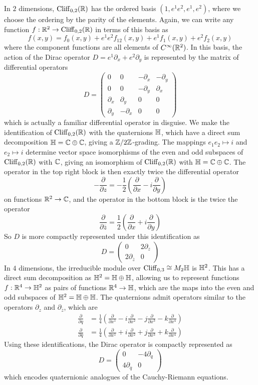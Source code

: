 In $2$ dimensions, $\operatorname{Cliff}_{0,2}(\mathbb{R})$ has the ordered basis $(1, e^1e^2, e^1,e^2)$,
where we choose the ordering by the parity of the elements. Again, we can
write any function $f : \mathbb{R}^2 \to \operatorname{Cliff}_{0,2}(\mathbb{R})$ in terms of this basis
as \[
f(x,y) = f_0(x,y) + e^1e^2f_{12}(x,y) + e^1f_1(x,y) + e^2f_2(x,y)
\]
where the component functions are all elements of $C^\infty(\mathbb{R}^2)$. In this
basis, the action of the Dirac operator $D = e^1\partial_x + e^2\partial_y$
is represented by the matrix of differential operators
\[
 D = \begin{pmatrix}
 0 & 0 & -\partial_x & -\partial_y \\
 0 & 0 & -\partial_y & \partial_x \\
 \partial_x & \partial_y & 0 & 0 \\
 \partial_y & -\partial_x & 0 & 0
 \end{pmatrix}
\]
which is actually a familiar differential operator in disguise. We make the
identification of $\operatorname{Cliff}_{0,2}(\mathbb{R})$ with the quaternions $\mathbb{H}$, which
have a direct sum decomposition $\mathbb{H} = \mathbb{C} \oplus \mathbb{C}$, giving a $\mathbb{Z}/2\mathbb{Z}$-grading.
The mappings $e_1e_2 \mapsto i$ and $e_2 \mapsto i$ determine vector space
isomorphisms of the even and odd subspaces of $\operatorname{Cliff}_{0,2}(\mathbb{R})$ with $\mathbb{C}$,
giving an isomorphism of $\operatorname{Cliff}_{0,2}(\mathbb{R})$ with $\mathbb{H} = \mathbb{C} \oplus \mathbb{C}$. The
operator in the top right block is then exactly twice the differential operator
\[
 -\frac{\partial}{\partial z} = -\frac{1}{2}\left( \frac{\partial}{\partial x}
 - i \frac{\partial}{\partial y}\right)
\]
on functions $\mathbb{R}^2 \to \mathbb{C}$, and the operator in the bottom block is the twice
the operator
\[
 \frac{\partial}{\partial \overline{z}} = \frac{1}{2}\left( \frac{\partial}{\partial x}
 + i \frac{\partial}{\partial y}\right)
\]
So $D$ is more compactly represented under this identification as
\[
 D = \begin{pmatrix}
 0 & 2\partial_z \\
 2\partial_{\overline{z}} & 0
 \end{pmatrix}
\]
In $4$ dimensions, the irreducible module over $\operatorname{Cliff}_{0,3} \cong M_2\mathbb{H}$ is
$\mathbb{H}^2$. This has a direct sum decomposition as $\mathbb{H}^2 = \mathbb{H} \oplus \mathbb{H}$, allowing
us to represent functions $f : \mathbb{R}^4 \to \mathbb{H}^2$ as pairs of functions $\mathbb{R}^4 \to \mathbb{H}$,
which are the maps into the even and odd subspaces of $\mathbb{H}^2 = \mathbb{H} \oplus \mathbb{H}$.
The quaternions admit operators similar to the operators $\partial_z$ and
$\partial_{\overline{z}}$, which are
%
\begin{align*}
 \frac{\partial}{\partial q}            & = \frac{1}{4}\left( \frac{\partial}{\partial x^1}
 - i \frac{\partial}{\partial x^2} - j\frac{\partial}{\partial x^3}
 - k \frac{\partial}{\partial x^4}\right) \\[5pt]
 \frac{\partial}{\partial \overline{q}} & = \frac{1}{4}\left( \frac{\partial}{\partial x^1}
 + i \frac{\partial}{\partial x^2} + j\frac{\partial}{\partial x^3}
 + k \frac{\partial}{\partial x^4}\right)
\end{align*}
%
Using these identifications, the Dirac operator is compactly represented as
\[
 D = \begin{pmatrix}
 0 & -4\partial_q \\
 4\partial_{\overline{q}} & 0
 \end{pmatrix}
\]
which encodes quaternionic analogues of the Cauchy-Riemann equations.
%
%
%
